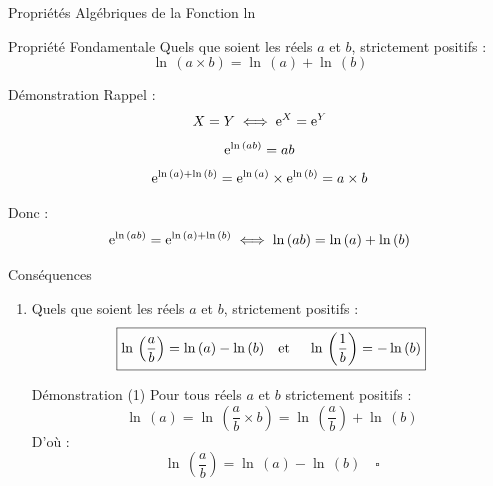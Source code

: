 \documentclass{coursbook}
\begin{document}
    \begin{Gpartie}{Propriétés Algébriques de la Fonction ln}
        \begin{Spartie}{Propriété Fondamentale}
            Quels que soient les réels $a$ et $b$, strictement positifs :
            \[\boxed{\ln\,(a\times b)=\ln\,(a)+\ln\,(b)}\]
            \begin{SSpartie}{Démonstration}
                Rappel : \[X=Y\iff \mathrm{e}^X=\mathrm{e}^Y\]
                \[\mathrm{e}^{\ln\,(ab)}=ab\]
                \[\mathrm{e}^{\ln\,(a)+\ln\,(b)}=\mathrm{e}^{\ln\,(a)}\times \mathrm{e}^{\ln\,(b)}=a\times b\]

                Donc : \[\mathrm{e}^{\ln\,(ab)}=\mathrm{e}^{\ln\,(a)+\ln\,(b)}\iff\ln\,(ab)=\ln\,(a)+\ln\,(b)\]
            \end{SSpartie}
        \end{Spartie}
        \begin{Spartie}{Conséquences}
            \begin{enumerate}[(1)]
                \item Quels que soient les réels $a$ et $b$, strictement positifs :
                \[\boxed{\ln\,\left(\frac{a}{b}\right)=\ln\,(a)-\ln\,(b)\text{\quad et \quad}\ln\,\left(\frac{1}{b}\right)=-\ln\,(b)}\]
                \begin{SSpartie}{Démonstration (1)} 
                    Pour tous réels $a$ et $b$ strictement positifs : \[\ln\,(a)=\ln\,\left(\frac{a}{b}\times b\right)=\ln\,\left(\frac{a}{b}\right)+\ln\,(b)\]
                    D'où : \[\ln\,\left(\frac{a}{b}\right)=\ln\,(a)-\ln\,(b)\quad\square\]


\end{SSpartie}
\end{enumerate}
\end{Spartie}
\end{Gpartie}
\end{document}
